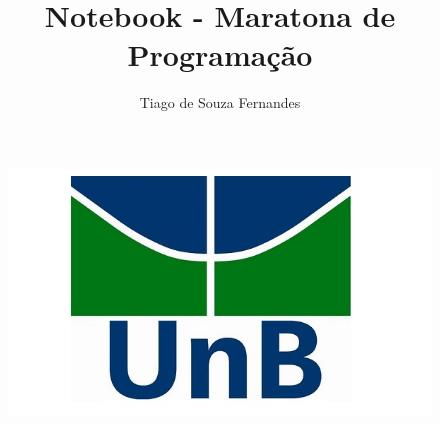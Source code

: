 \documentclass{article}
\title{Notebook - Maratona de Programação}
\author{Tiago de Souza Fernandes}
\date{}
\begin{document}
\begin{figure}[t]
\includegraphics[scale=0.4]{unb.jpg}
\centering
\end{figure}
\maketitle
\end{document}
